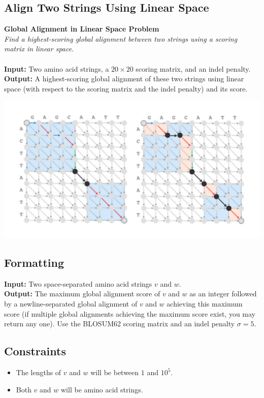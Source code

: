 \documentclass{article}
\begin{document}
\subsection{Align Two Strings Using Linear Space}
\hline\vspace{5}
\textbf{Global Alignment in Linear Space Problem}\\
\emph{Find a highest-scoring global alignment between two strings using a scoring matrix in linear space}.\\ \\
\textbf{Input:} Two amino acid strings, a $20\times 20$ scoring matrix, and an indel penalty.\\
\textbf{Output:} A highest-scoring global alignment of these two strings using linear space (with respect to the scoring matrix and the indel penalty) and its score.
\begin{center}
    \includegraphics[scale=0.32]{c5/logos/5L.png}
\end{center}
\hline\vspace{5}

\subsection*{Formatting}
\noindent\textbf{Input:} Two space-separated amino acid strings $v$ and $w$.\\
\noindent\textbf{Output:} The maximum global alignment score of $v$ and $w$ as an integer followed by a newline-separated global alignment of $v$ and $w$ achieving this maximum score (if multiple global alignments achieving the maximum score exist, you may return any one). Use the BLOSUM62 scoring matrix and an indel penalty $\sigma=5$.

\subsection*{Constraints}
\begin{itemize}
    \item The lengths of $v$ and $w$ will be between $1$ and $10^5$.
    \item Both $v$ and $w$ will be amino acid strings.
\end{itemize}
\pagebreak
\end{document}
